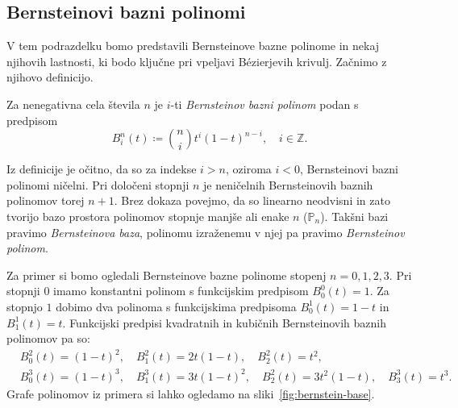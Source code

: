 \documentclass[isrm2, tisk]{fmfdelo}
\newcommand{\Z}{\mathbb Z}
\newcommand{\bernstein}[2]{\binom{#1}{#2}t^{#2}(1-t)^{#1-#2}}
\begin{document}
    \subsection{Bernsteinovi bazni polinomi}\label{subsec:bernsteinovi-polinomi}
    V tem podrazdelku bomo predstavili Bernsteinove bazne polinome in nekaj njihovih lastnosti, ki bodo ključne pri vpeljavi Bézierjevih krivulj.
    Začnimo z njihovo definicijo.
    \begin{definicija}
        \label{def:bernstein}
        Za nenegativna cela števila $n$ je $i$-ti \textit{Bernsteinov bazni polinom} podan s predpisom \[B_i^n(t)\coloneqq\bernstein{n}{i},\quad i\in\Z.\]
    \end{definicija}
    \noindent Iz definicije je očitno, da so za indekse $i>n$, oziroma $i<0$, Bernsteinovi bazni polinomi ničelni.
    Pri določeni stopnji $n$ je neničelnih Bernsteinovih baznih polinomov torej $n+1$.
    Brez dokaza povejmo, da so linearno neodvisni in zato tvorijo bazo prostora polinomov stopnje manjše ali enake $n$ ($\mathbb{P}_n$).
    Takšni bazi pravimo \textit{Bernsteinova baza}, polinomu izraženemu v njej pa pravimo \textit{Bernsteinov polinom}.
    \begin{primer}
        \label{primer:bernsteinovi}
        Za primer si bomo ogledali Bernsteinove bazne polinome stopenj $n=0,1,2,3$.
        Pri stopnji $0$ imamo konstantni polinom s funkcijskim predpisom $B_{0}^{0}(t) = 1$.
        Za stopnjo $1$ dobimo dva polinoma s funkcijskima predpisoma $B_{0}^{1}(t) = 1-t$ in $B_{1}^{1}(t) = t$.
        Funkcijski predpisi kvadratnih in kubičnih Bernsteinovih baznih polinomov pa so:
        \begin{align*}
            &B_{0}^{2}(t) = (1-t)^2,\quad B_{1}^{2}(t) = 2t(1-t),\quad B_{2}^{2}(t) = t^2,  \\
            &B_{0}^{3}(t) = (1-t)^3,\quad B_{1}^{3}(t) = 3t(1-t)^2,\quad B_{2}^{2}(t) = 3t^2(1-t),\quad B_{3}^{3}(t) = t^3.
        \end{align*}
        Grafe polinomov iz primera si lahko ogledamo na sliki~\ref{fig:bernstein-base}.
    \end{primer}
\end{document}
